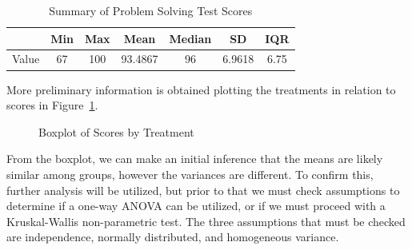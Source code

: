 \documentclass[
  letterpaper,
  DIV=11,
  numbers=noendperiod]{scrartcl}
\begin{document}
\begin{longtable}[]{@{}lcccccc@{}}

\caption{\label{tbl-table1}Summary of Problem Solving Test Scores}

\tabularnewline

\toprule\noalign{}
& Min & Max & Mean & Median & SD & IQR \\
\midrule\noalign{}
\endhead
\bottomrule\noalign{}
\endlastfoot
Value & 67 & 100 & 93.4867 & 96 & 6.9618 & 6.75 \\

\end{longtable}

More preliminary information is obtained plotting the treatments in
relation to scores in Figure~\ref{fig-boxplot1}.

\begin{figure}[H]


\caption{\label{fig-boxplot1}Boxplot of Scores by Treatment}

\end{figure}%

From the boxplot, we can make an initial inference that the means are
likely similar among groups, however the variances are different. To
confirm this, further analysis will be utilized, but prior to that we
must check assumptions to determine if a one-way ANOVA can be utilized,
or if we must proceed with a Kruskal-Wallis non-parametric test. The
three assumptions that must be checked are independence, normally
distributed, and homogeneous variance.
\end{document}
